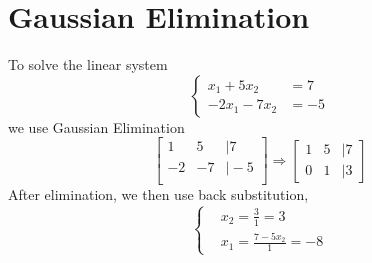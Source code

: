 	\section{Gaussian Elimination}
	
	\begin{ex}
		To solve the linear system
		\[ \begin{cases}
		x_1 + 5x_2 &= 7\\
		-2x_1 - 7x_2 &= -5
		\end{cases} \]
		we use Gaussian Elimination
		\[ \begin{bmatrix}
		1 & 5 &\vert 7\\
		-2 & -7 &\vert -5\\
		\end{bmatrix} 
		\Rightarrow
		\begin{bmatrix}
		1 &5 &\vert 7\\
		0 &1 &\vert 3
		\end{bmatrix}
		\]
		After elimination, we then use back substitution,
		\[ \begin{cases}
		&x_2 = \frac{3}{1} = 3\\
		&x_1 = \frac{7 - 5x_2}{1} = -8
		\end{cases} \]
	\end{ex}
	
